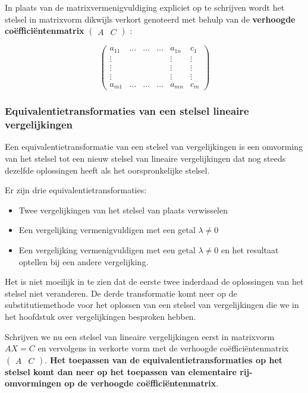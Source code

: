 In plaats van de matrixvermenigvuldiging expliciet op te schrijven wordt het stelsel in matrixvorm dikwijls verkort genoteerd met behulp van de {\bf verhoogde co\"{e}ffici\"{e}ntenmatrix} $\left( \begin{array}{c|c} A & C \end{array} \right)$ : 

\[
\left( 
\begin{array}{ccccc|c}
a_{11} & \ldots & \ldots & \ldots & a_{1n} & c_1 \\ \vdots & & & & \vdots & \vdots \\ \vdots & & & & \vdots & \vdots \\ \vdots & & & & \vdots & \vdots \\ a_{m1} & \ldots & \ldots & \ldots & a_{mn} & c_m
\end{array} 
\right)
\]

\subsubsection{Equivalentietransformaties van een stelsel lineaire vergelijkingen}

Een equivalentietransformatie van een stelsel van vergelijkingen is een omvorming van het stelsel tot een nieuw stelsel van lineaire vergelijkingen dat nog steeds dezelfde oplossingen heeft als het oorspronkelijke stelsel. 

\begin{framed}
Er zijn drie equivalentietransformaties:

\begin{itemize}
	\item Twee vergelijkingen van het stelsel van plaats verwisselen
	\item Een vergelijking vermenigvuldigen met een getal $\lambda \neq 0$
	\item Een vergelijking vermenigvuldigen met een getal $\lambda \neq 0$ en het resultaat optellen bij een andere vergelijking.
\end{itemize}
\end{framed}

Het is niet moeilijk in te zien dat de eerste twee inderdaad de oplossingen van het stelsel niet veranderen. De derde transformatie komt neer op de substitutiemethode voor het oplossen van een stelsel van vergelijkingen die we in het hoofdstuk over vergelijkingen besproken hebben. 

\begin{framed}
Schrijven we nu een stelsel van lineaire vergelijkingen eerst in matrixvorm\\ $AX=C$ en vervolgens in verkorte vorm met de verhoogde co\"{e}ffici\"{e}ntenmatrix $\left( \begin{array}{c|c} A & C \end{array} \right)$. {\bf Het toepassen van de equivalentietransformaties op het stelsel komt dan neer op het toepassen van elementaire rij-omvormingen op de verhoogde co\"{e}ffici\"{e}ntenmatrix}. 
\end{framed}

